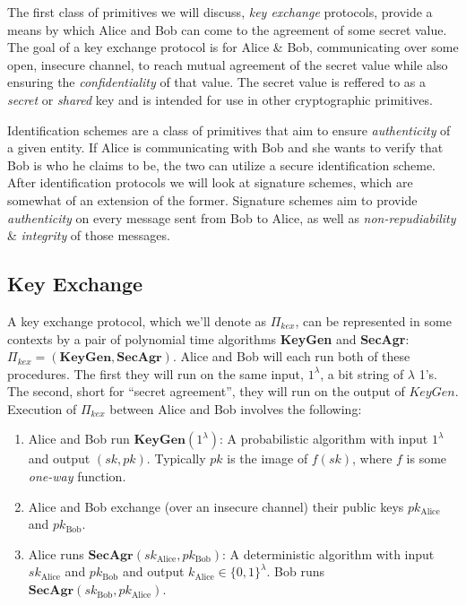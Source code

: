 The first class of primitives we will discuss, \emph{key exchange} protocols, provide a means by which Alice and Bob can come to the agreement of some secret value. The goal of a key exchange protocol is for Alice \& Bob, communicating over some open, insecure channel, to reach mutual agreement of the secret value while also ensuring the \emph{confidentiality} of that value. The secret value is reffered to as a \emph{secret} or \emph{shared} key and is intended for use in other cryptographic primitives. 

Identification schemes are a class of primitives that aim to ensure \emph{authenticity} of a given entity. If Alice is communicating with Bob and she wants to verify that Bob is who he claims to be, the two can utilize a secure identification scheme. After identification protocols we will look at signature schemes, which are somewhat of an extension of the former. Signature schemes aim to provide \emph{authenticity} on every message sent from Bob to Alice, as well as \emph{non-repudiability} \& \emph{integrity} of those messages.\\

\subsection{Key Exchange}

A key exchange protocol, which we'll denote as $\Pi_{kex}$, can be represented in some contexts by a pair of polynomial time algorithms \textbf{KeyGen} and \textbf{SecAgr}: $\Pi_{kex} = (\textbf{KeyGen},\textbf{SecAgr})$. Alice and Bob will each run both of these procedures. The first they will run on the same input, $1^\lambda$, a bit string of $\lambda$ 1's. The second, short for ``secret agreement'', they will run on the output of $KeyGen$.\\

Execution of $\Pi_{kex}$ between Alice and Bob involves the following:
\begin{enumerate}[label=(\roman*)]
\item Alice and Bob run $\textbf{KeyGen}(1^\lambda)$: A probabilistic algorithm with input $1^\lambda$ and output $(sk,pk)$. Typically $pk$ is the image of $f(sk)$, where $f$ is some \emph{one-way} function.
\item Alice and Bob exchange (over an insecure channel) their public keys $pk_{\text{Alice}}$ and $pk_{\text{Bob}}$.
\item Alice runs $\textbf{SecAgr}(sk_{\text{Alice}}, pk_{\text{Bob}})$: A deterministic algorithm with input $sk_{\text{Alice}}$ and $pk_{\text{Bob}}$ and output $k_{\text{Alice}} \in \{0,1\}^\lambda$. Bob runs $\textbf{SecAgr}(sk_{\text{Bob}}, pk_{\text{Alice}})$.
\end{enumerate}

